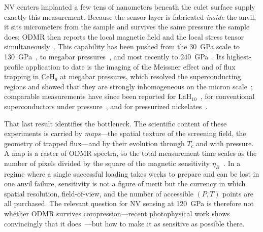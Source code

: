 \documentclass[preprint,12pt]{elsarticle}
\begin{document}
NV centers implanted a few tens of nanometers beneath the culet surface supply
exactly this measurement. Because the sensor layer is fabricated \emph{inside}
the anvil, it sits micrometers from the sample and survives the same pressure the
sample does; ODMR then reports the local magnetic field and the local stress
tensor simultaneously~\cite{Doherty2014,Hsieh2019,Lesik2019,Yip2019}. This
capability has been pushed from the \SI{30}{\giga\pascal} scale to
\SI{130}{\giga\pascal}~\cite{Hilberer2023}, to megabar
pressures~\cite{Dai2022,Wang2024}, and most recently to
\SI{240}{\giga\pascal}~\cite{Hao2025}. Its highest-profile application to date is
the imaging of the Meissner effect and of flux trapping in CeH$_9$ at megabar
pressures, which resolved the superconducting regions and showed that they are
strongly inhomogeneous on the micron scale~\cite{Bhattacharyya2024}; comparable
measurements have since been reported for LaH$_{10}$~\cite{ChenLaH2025}, for
conventional superconductors under pressure~\cite{Dailledouze2025}, and for
pressurized nickelates~\cite{Mandyam2026}.

That last result identifies the bottleneck. The scientific content of these
experiments is carried by \emph{maps}---the spatial texture of the screening
field, the geometry of trapped flux---and by their evolution through $T_c$ and
with pressure. A map is a raster of ODMR spectra, so the total measurement time
scales as the number of pixels divided by the square of the magnetic sensitivity
$\eta_B$~\cite{Barry2020}. In a regime where a single successful loading takes
weeks to prepare and can be lost in one anvil failure, sensitivity is not a
figure of merit but the currency in which spatial resolution, field-of-view, and
the number of accessible $(P,T)$ points are all purchased. The relevant question
for NV sensing at \SI{120}{\giga\pascal} is therefore not whether ODMR survives
compression---recent photophysical work shows convincingly that it
does~\cite{Ho2026,Huang2025ISC}---but how to make it as sensitive as possible
there.
\end{document}
